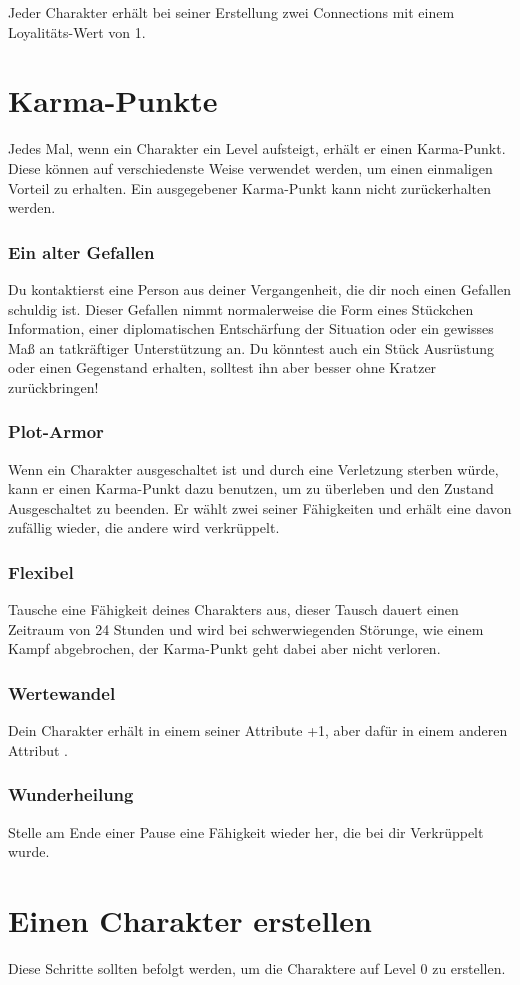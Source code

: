 Jeder Charakter erhält bei seiner Erstellung zwei Connections mit einem Loyalitäts-Wert von 1.
\section{Karma-Punkte}
\label{sec:karmapunkte}
Jedes Mal, wenn ein Charakter ein Level aufsteigt, erhält er einen Karma-Punkt. Diese können auf verschiedenste Weise verwendet werden, um einen einmaligen Vorteil zu erhalten. Ein ausgegebener Karma-Punkt kann nicht zurückerhalten werden.
\subsubsection{Ein alter Gefallen}
Du kontaktierst eine Person aus deiner Vergangenheit, die dir noch einen Gefallen schuldig ist. Dieser Gefallen nimmt normalerweise die Form eines Stückchen Information, einer diplomatischen Entschärfung der Situation oder ein gewisses Maß an tatkräftiger Unterstützung an. Du könntest auch ein Stück Ausrüstung oder einen Gegenstand erhalten, solltest ihn aber besser ohne Kratzer zurückbringen!
\subsubsection{Plot-Armor} 
Wenn ein Charakter ausgeschaltet ist und durch eine Verletzung sterben würde, kann er einen Karma-Punkt dazu benutzen, um zu überleben und den Zustand \glqq Ausgeschaltet\grqq{} zu beenden. Er wählt zwei seiner Fähigkeiten und erhält eine davon zufällig wieder, die andere wird verkrüppelt.
\subsubsection{Flexibel} 
Tausche eine Fähigkeit deines Charakters aus, dieser Tausch dauert einen Zeitraum von 24 Stunden und wird bei schwerwiegenden Störunge, wie einem Kampf abgebrochen, der Karma-Punkt geht dabei aber nicht verloren.
\subsubsection{Wertewandel} 
Dein Charakter erhält in einem seiner Attribute \glqq +1\grqq{}, aber dafür in einem anderen Attribut \grqq{}.
\subsubsection{Wunderheilung}
Stelle am Ende einer Pause eine Fähigkeit wieder her, die bei dir Verkrüppelt wurde.
\section{Einen Charakter erstellen}
Diese Schritte sollten befolgt werden, um die Charaktere auf Level 0 zu erstellen.
